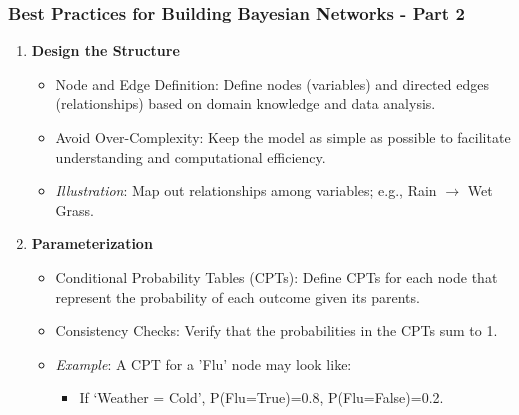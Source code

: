 \documentclass[aspectratio=169]{beamer}
\begin{document}
\begin{frame}[fragile]
    \frametitle{Best Practices for Building Bayesian Networks - Part 2}
    \begin{enumerate}[start=3]
        \item \textbf{Design the Structure}
        \begin{itemize}
            \item Node and Edge Definition: Define nodes (variables) and directed edges (relationships) based on domain knowledge and data analysis.
            \item Avoid Over-Complexity: Keep the model as simple as possible to facilitate understanding and computational efficiency.
            \item \textit{Illustration}: Map out relationships among variables; e.g., Rain $\rightarrow$ Wet Grass.
        \end{itemize}
        
        \item \textbf{Parameterization}
        \begin{itemize}
            \item Conditional Probability Tables (CPTs): Define CPTs for each node that represent the probability of each outcome given its parents.
            \item Consistency Checks: Verify that the probabilities in the CPTs sum to 1.
            \item \textit{Example}: A CPT for a 'Flu' node may look like:
            \begin{itemize}
                \item If ‘Weather = Cold’, P(Flu=True)=0.8, P(Flu=False)=0.2.
            \end{itemize}
        \end{itemize}
    \end{enumerate}
\end{frame}
\end{document}
